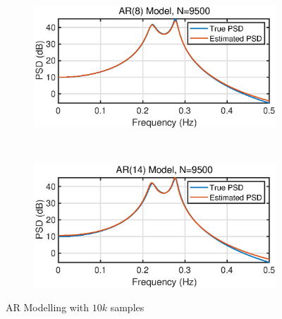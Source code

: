\begin{figure}[htbp]
     ~
     \begin{subfigure}[b]{0.35\textwidth}
         \centering
         \includegraphics[width=\textwidth]{fig/14/14c3.eps}
     \end{subfigure}
     ~
     \begin{subfigure}[b]{0.35\textwidth}
         \centering
         \includegraphics[width=\textwidth]{fig/14/14c4.eps}
     \end{subfigure}
        \caption{AR Modelling with $10k$ samples}
        \label{fig:1_4_c}
\end{figure}
